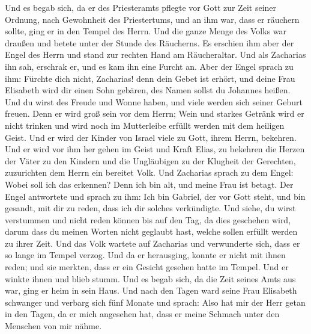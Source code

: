  Und es begab sich, da er des Priesteramts pflegte vor
Gott zur Zeit seiner Ordnung,  nach Gewohnheit des
Priestertums, und an ihm war, dass er räuchern sollte, ging er in den
Tempel des Herrn.  Und die ganze Menge des Volks war
draußen und betete unter der Stunde des Räucherns.  Es
erschien ihm aber der Engel des Herrn und stand zur rechten Hand am
Räucheraltar.  Und als Zacharias ihn sah, erschrak er,
und es kam ihn eine Furcht an.  Aber der Engel sprach zu
ihm: Fürchte dich nicht, Zacharias! denn dein Gebet ist erhört, und
deine Frau Elisabeth wird dir einen Sohn gebären, des Namen sollst du
Johannes heißen.  Und du wirst des Freude und Wonne
haben, und viele werden sich seiner Geburt freuen.  Denn
er wird groß sein vor dem Herrn; Wein und starkes Getränk wird er nicht
trinken und wird noch im Mutterleibe erfüllt werden mit dem heiligen
Geist.  Und er wird der Kinder von Israel viele zu Gott,
ihrem Herrn, bekehren.  Und er wird vor ihm her gehen im
Geist und Kraft Elias, zu bekehren die Herzen der Väter zu den Kindern
und die Ungläubigen zu der Klugheit der Gerechten, zuzurichten dem Herrn
ein bereitet Volk.  Und Zacharias sprach zu dem Engel:
Wobei soll ich das erkennen? Denn ich bin alt, und meine Frau ist
betagt.  Der Engel antwortete und sprach zu ihm: Ich bin
Gabriel, der vor Gott steht, und bin gesandt, mit dir zu reden, dass ich
dir solches verkündigte.  Und siehe, du wirst verstummen
und nicht reden können bis auf den Tag, da dies geschehen wird, darum
dass du meinen Worten nicht geglaubt hast, welche sollen erfüllt werden
zu ihrer Zeit.  Und das Volk wartete auf Zacharias und
verwunderte sich, dass er so lange im Tempel verzog.  Und
da er herausging, konnte er nicht mit ihnen reden; und sie merkten, dass
er ein Gesicht gesehen hatte im Tempel. Und er winkte ihnen und blieb
stumm.  Und es begab sich, da die Zeit seines Amts aus
war, ging er heim in sein Haus.  Und nach den Tagen ward
seine Frau Elisabeth schwanger und verbarg sich fünf Monate und sprach:
 Also hat mir der Herr getan in den Tagen, da er mich
angesehen hat, dass er meine Schmach unter den Menschen von mir nähme.

